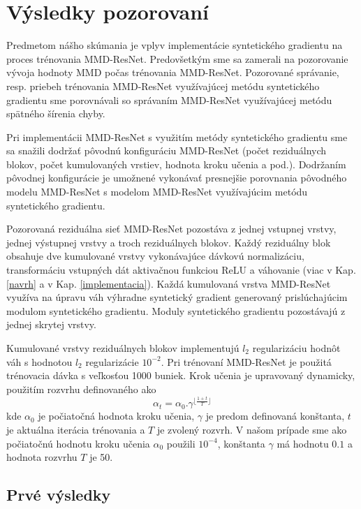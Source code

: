 \chapter{Výsledky pozorovaní}
\label{vysledky}

Predmetom nášho skúmania je vplyv implementácie syntetického gradientu na proces trénovania MMD-ResNet. Predovšetkým sme sa zamerali na pozorovanie vývoja hodnoty MMD počas trénovania MMD-ResNet. Pozorované správanie, resp. priebeh trénovania MMD-ResNet využívajúcej metódu syntetického gradientu sme porovnávali so správaním MMD-ResNet využívajúcej metódu spätného šírenia chyby.

Pri implementácii MMD-ResNet s využitím metódy syntetického gradientu sme sa snažili dodržať pôvodnú konfiguráciu MMD-ResNet (počet reziduálnych blokov, počet kumulovaných vrstiev, hodnota kroku učenia a pod.). Dodržaním pôvodnej konfigurácie je umožnené vykonávať presnejšie porovnania pôvodného modelu MMD-ResNet s modelom MMD-ResNet využívajúcim metódu syntetického gradientu.

Pozorovaná reziduálna sieť MMD-ResNet pozostáva z jednej vstupnej vrstvy, jednej výstupnej vrstvy a troch reziduálnych blokov. Každý reziduálny blok obsahuje dve kumulované vrstvy vykonávajúce dávkovú normalizáciu, transformáciu vstupných dát aktivačnou funkciou ReLU \cite{Goh1995} a váhovanie (viac v Kap. \ref{navrh} a v Kap. \ref{implementacia}). Každá kumulovaná vrstva MMD-ResNet využíva na úpravu váh výhradne syntetický gradient generovaný prislúchajúcim modulom syntetického gradientu. Moduly syntetického gradientu pozostávajú z jednej skrytej vrstvy.

Kumulované vrstvy reziduálnych blokov implementujú $l_2$ regularizáciu hodnôt váh s hodnotou $l_2$ regularizácie $10^{-2}$. Pri trénovaní MMD-ResNet je použitá trénovacia dávka s veľkosťou 1000 buniek. Krok učenia je upravovaný dynamicky, použitím rozvrhu definovaného ako 
\[
    \alpha_t = \alpha_0 . \gamma^{\lfloor\frac{1+t}{T}\rfloor}
\]
kde $\alpha_0$ je počiatočná hodnota kroku učenia, $\gamma$ je predom definovaná konštanta, $t$ je aktuálna iterácia trénovania a $T$ je zvolený rozvrh. V našom prípade sme ako počiatočnú hodnotu kroku učenia $\alpha_0$ použili $10^{-4}$, konštanta $\gamma$ má hodnotu $0.1$ a hodnota rozvrhu $T$ je 50.

\section{Prvé výsledky}
\label{prve_vysledky}

